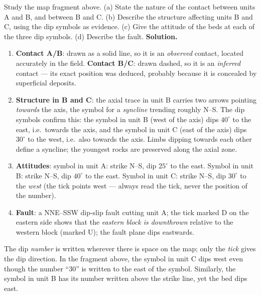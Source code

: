 \documentclass[11pt]{article}
\begin{document}
\begin{exoresolu}
Study the map fragment above. (a) State the nature of the contact between units A and B, and between B and C. (b) Describe the structure affecting units B and C, using the dip symbols as evidence. (c) Give the attitude of the beds at each of the three dip symbols. (d) Describe the fault.
\tcblower
\textbf{Solution.}
\begin{enumerate}
\item \textbf{Contact A/B}: drawn as a solid line, so it is an \emph{observed} contact, located accurately in the field. \textbf{Contact B/C}: drawn dashed, so it is an \emph{inferred} contact --- its exact position was deduced, probably because it is concealed by superficial deposits.
\item \textbf{Structure in B and C}: the axial trace in unit B carries two arrows pointing \emph{towards} the axis, the symbol for a \emph{syncline} trending roughly N--S. The dip symbols confirm this: the symbol in unit B (west of the axis) dips $40^{\circ}$ to the east, i.e.\ towards the axis, and the symbol in unit C (east of the axis) dips $30^{\circ}$ to the west, i.e.\ also towards the axis. Limbs dipping towards each other define a syncline; the youngest rocks are preserved along the axial zone.
\item \textbf{Attitudes}: symbol in unit A: strike N--S, dip $25^{\circ}$ to the east. Symbol in unit B: strike N--S, dip $40^{\circ}$ to the east. Symbol in unit C: strike N--S, dip $30^{\circ}$ to the \emph{west} (the tick points west --- always read the tick, never the position of the number).
\item \textbf{Fault}: a NNE--SSW dip-slip fault cutting unit A; the tick marked D on the eastern side shows that the \emph{eastern block is downthrown} relative to the western block (marked U); the fault plane dips eastwards.
\end{enumerate}
\end{exoresolu}

\begin{attention}
The dip \emph{number} is written wherever there is space on the map; only the \emph{tick} gives the dip direction. In the fragment above, the symbol in unit C dips west even though the number ``30'' is written to the east of the symbol. Similarly, the symbol in unit B has its number written above the strike line, yet the bed dips east.
\end{attention}
\end{document}
